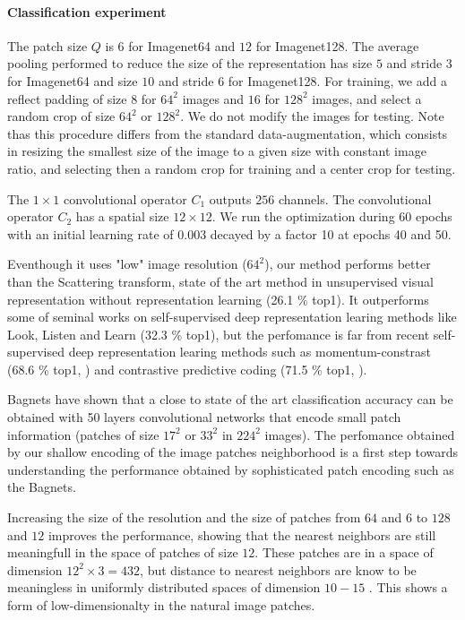 \documentclass{article}
\begin{document}
{\paragraph{Classification experiment}
The patch size $Q$ is $6$ for Imagenet64 and $12$ for Imagenet128.
The average pooling performed to reduce the size of the representation has  size $5$ and stride $3$ for Imagenet64 and size $10$ and stride $6$ for Imagenet128.
For training, we add a reflect padding of size $8$ for $64^2$ images and $16$ for $128^2$ images, and select a random crop of size $64^2$ or $128^2$.
We do not  modify the images for testing.
Note thas this procedure differs from the standard data-augmentation, which consists in resizing the smallest size of the image to a given size with constant image ratio, and selecting then a random crop for training and a center crop for testing.

The $1 \times 1$ convolutional operator $C_1$ outputs $256$ channels.
The convolutional operator $C_2$ has a spatial size $12 \times 12$.
We run the optimization during 60 epochs with an initial learning rate of 0.003 decayed by a factor 10 at epochs 40 and 50.

Eventhough it uses "low" image resolution ($64^2$), our method performs better than the  Scattering transform, state of the art method in unsupervised visual representation without representation learning (26.1 \% top1).
It outperforms some of seminal works on self-supervised deep representation learing methods like Look, Listen and Learn \citep{arandjelovic2017look} (32.3 \% top1), but the perfomance is far from recent self-supervised deep representation learing methods such as momentum-constrast (68.6 \% top1, \citep{he2019momentum} ) and contrastive predictive coding (71.5 \% top1, \citep{henaff2019data}).

Bagnets \citep{brendel2019approximating} have shown that a close to state of the art classification accuracy can be obtained with 50 layers convolutional networks that encode small patch information (patches of size $17^2$ or $33^2$ in $224^2$ images).
The perfomance obtained by our shallow encoding of the image patches neighborhood is a first step towards understanding the performance obtained by sophisticated patch encoding such as the Bagnets.
 
Increasing the size of the resolution and the size of patches from $64$ and $6$ to $128$ and $12$ improves the performance, showing that the nearest neighbors are still meaningfull in the space of patches of size $12$.
These patches are in a space of dimension $12^2 \times 3 = 432$, but distance to nearest neighbors are know to be meaningless in uniformly distributed spaces of dimension $10 -15$ \citep{beyer1999nearest}.
This shows a form of low-dimensionalty in the natural image patches.


}
\end{document}
